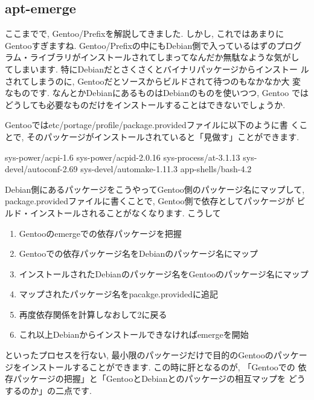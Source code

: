 \documentclass[mingoth,a4paper]{jsarticle}
\begin{document}
\begin{commandline}

\end{commandline}

\subsection{apt-emerge}

ここまでで, Gentoo/Prefixを解説してきました. しかし, これではあまりに
Gentooすぎますね. Gentoo/Prefixの中にもDebian側で入っているはずのプログ
ラム・ライブラリがインストールされてしまってなんだか無駄なような気がし
てしまいます. 特にDebianだとさくさくとバイナリパッケージからインストー
ルされてしまうのに, Gentooだとソースからビルドされて待つのもなかなか大
変なものです. なんとかDebianにあるものはDebianのものを使いつつ, Gentoo
ではどうしても必要なものだけをインストールすることはできないでしょうか.

Gentooではetc/portage/profile/package.providedファイルに以下のように書
くことで, そのパッケージがインストールされていると「見做す」ことができます. 

\begin{commandline}
sys-power/acpi-1.6
sys-power/acpid-2.0.16
sys-process/at-3.1.13
sys-devel/autoconf-2.69
sys-devel/automake-1.11.3
app-shells/bash-4.2
\end{commandline}

Debian側にあるパッケージをこうやってGentoo側のパッケージ名にマップして,
package.providedファイルに書くことで, Gentoo側で依存としてパッケージが
ビルド・インストールされることがなくなります. こうして

\begin{enumerate}
\item Gentooのemergeでの依存パッケージを把握
\item Gentooでの依存パッケージ名をDebianのパッケージ名にマップ
\item インストールされたDebianのパッケージ名をGentooのパッケージ名にマップ
\item マップされたパッケージ名をpacakge.providedに追記
\item 再度依存関係を計算しなおして2に戻る
\item これ以上Debianからインストールできなければemergeを開始
\end{enumerate}

といったプロセスを行ない, 最小限のパッケージだけで目的のGentooのパッケー
ジをインストールすることができます. この時に肝となるのが, 「Gentooでの
  依存パッケージの把握」と「GentooとDebianとのパッケージの相互マップを
  どうするのか」の二点です.
\end{document}
